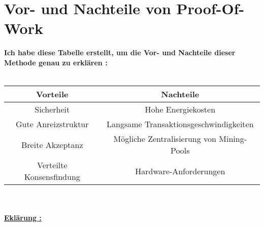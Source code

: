 \documentclass[ngerman]{scrreprt}
\begin{document}
\section{Vor- und Nachteile von Proof-Of-Work}
\textbf{Ich habe diese Tabelle erstellt, um die Vor- und Nachteile dieser Methode genau zu erklären : } \\ \\
\begin{tabular}{|c|c|}
	\hline
	\textbf{Vorteile} & \textbf{Nachteile} \\ \hline
	Sicherheit & Hohe Energiekosten \\ \hline
	Gute Anreizstruktur & Langsame Transaktionsgeschwindigkeiten \\ \hline
	Breite Akzeptanz & Mögliche Zentralisierung von Mining-Pools \\ \hline
	Verteilte Konsensfindung & Hardware-Anforderungen \\ \hline
\end{tabular}\\ \\
\textbf{\underline{Eklärung :}}
\end{document}
